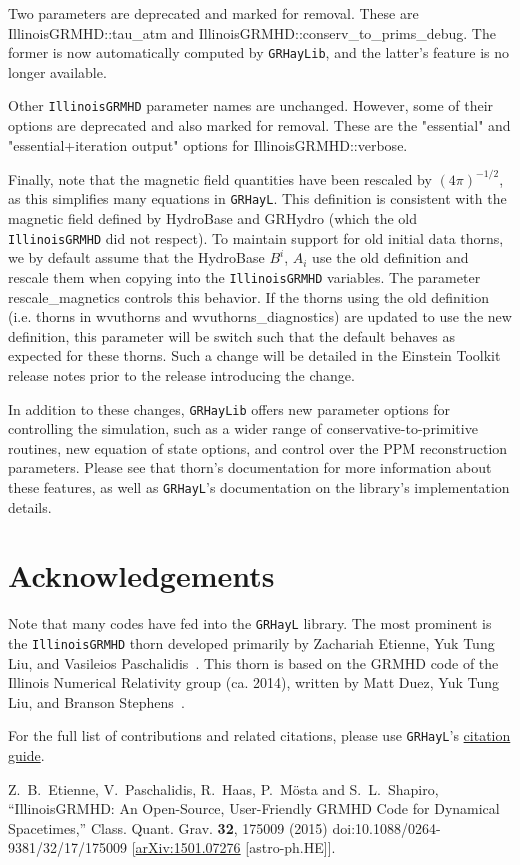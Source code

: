 \documentclass{article}
\newcommand{\grhayl}{\texttt{GRHayL}\xspace}
\newcommand{\glib}{\texttt{GRHayLib}\xspace}
\newcommand{\igm}{\texttt{IllinoisGRMHD}\xspace}
\begin{document}
Two parameters are deprecated and marked for removal. These are
IllinoisGRMHD::tau\_atm and IllinoisGRMHD::conserv\_to\_prims\_debug. The former
is now automatically computed by \glib, and the latter's feature is no
longer available.

Other \igm parameter names are unchanged. However, some of their options
are deprecated and also marked for removal. These are the "essential" and
"essential+iteration output" options for IllinoisGRMHD::verbose.

Finally, note that the magnetic field quantities have been rescaled by
$\left(4\pi\right)^{-1/2}$, as this simplifies many equations in \grhayl.
This definition is consistent with the magnetic field defined by HydroBase
and GRHydro (which the old \igm did not respect). To maintain support for
old initial data thorns, we by default assume that the HydroBase $B^i$,
$A_i$ use the old definition and rescale them when copying into the \igm
variables. The parameter rescale\_magnetics controls this behavior. If
the thorns using the old definition (i.e. thorns in wvuthorns and
wvuthorns\_diagnostics) are updated to use the new definition, this parameter
will be switch such that the default behaves as expected for these thorns.
Such a change will be detailed in the Einstein Toolkit release notes prior
to the release introducing the change.

In addition to these changes, \glib offers new parameter options for
controlling the simulation, such as a wider range of conservative-to-primitive
routines, new equation of state options, and control over the PPM reconstruction
parameters. Please see that thorn's documentation for more information about these
features, as well as \grhayl's documentation on the library's implementation
details.

\section{Acknowledgements}

Note that many codes have fed into the \grhayl library. The most prominent is
the \igm thorn developed primarily by Zachariah Etienne, Yuk Tung Liu, and
Vasileios Paschalidis~\cite{WVUThorns_IllinoisGRMHD_Etienne:2015cea}. This
thorn is based on the GRMHD code of the Illinois Numerical Relativity group
(ca. 2014), written by Matt Duez, Yuk Tung Liu, and Branson Stephens~.

For the full list of contributions and related citations, please use \grhayl's
\href{https://github.com/GRHayL/GRHayL/wiki/Citation-and-License-Guide}{citation guide}.

\begin{thebibliography}{9}

Z.~B.~Etienne, V.~Paschalidis, R.~Haas, P.~M\"osta and S.~L.~Shapiro,
``IllinoisGRMHD: An Open-Source, User-Friendly GRMHD Code for Dynamical
Spacetimes,''
Class. Quant. Grav. \textbf{32}, 175009 (2015)
doi:10.1088/0264-9381/32/17/175009
[\href{https://arxiv.org/abs/1501.07276}{arXiv:1501.07276} [astro-ph.HE]].

\end{thebibliography}

\end{document}
